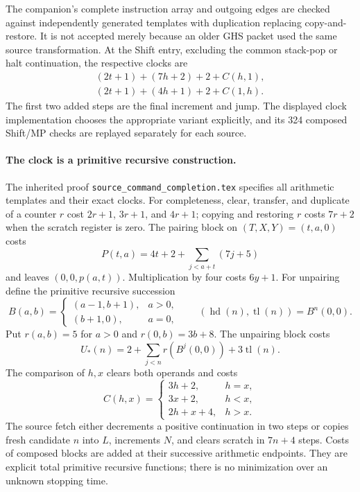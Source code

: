 The companion's complete instruction array and outgoing edges are checked
against independently generated templates with duplication replacing
copy-and-restore.  It is not accepted merely because an older GHS packet
used the same source transformation.  At the Shift entry, excluding the
common stack-pop or halt continuation, the respective clocks are
\[
\begin{aligned}
 (2t+1)+(7h+2)+2+C(h,1),\\
 (2t+1)+(4h+1)+2+C(1,h).
\end{aligned}
\]
The first two added steps are the final increment and jump.  The displayed
clock implementation chooses the appropriate variant explicitly, and its
324 composed Shift/MP checks are replayed separately for each source.

\paragraph{The clock is a primitive recursive construction.}
The inherited proof \texttt{source\_command\_completion.tex} specifies
all arithmetic templates and their exact clocks.  For completeness, clear,
transfer, and duplicate of a counter $r$ cost $2r+1$, $3r+1$, and $4r+1$;
copying and restoring $r$ costs $7r+2$ when the scratch register is zero.
The pairing block on $(T,X,Y)=(t,a,0)$ costs
\[
 P(t,a)=4t+2+\sum_{j<a+t}(7j+5)
\]
and leaves $(0,0,p(a,t))$.  Multiplication by four costs $6y+1$.
For unpairing define the primitive recursive succession
\[
 B(a,b)=\begin{cases}(a-1,b+1),&a>0,\\(b+1,0),&a=0,\end{cases}
 \qquad (\operatorname{hd}(n),\operatorname{tl}(n))=B^n(0,0).
\]
Put $r(a,b)=5$ for $a>0$ and $r(0,b)=3b+8$.  The unpairing block costs
\[
 U_*(n)=2+\sum_{j<n}r(B^j(0,0))+3\operatorname{tl}(n).
\]
The comparison of $h,x$ clears both operands and costs
\[
 C(h,x)=\begin{cases}3h+2,&h=x,\\3x+2,&h<x,\\2h+x+4,&h>x.\end{cases}
\]
The source fetch either decrements a positive continuation in two steps or
copies fresh candidate $n$ into $L$, increments $N$, and clears scratch in
$7n+4$ steps.  Costs of composed blocks are added at their successive
arithmetic endpoints.  They are explicit total primitive recursive
functions; there is no minimization over an unknown stopping time.

